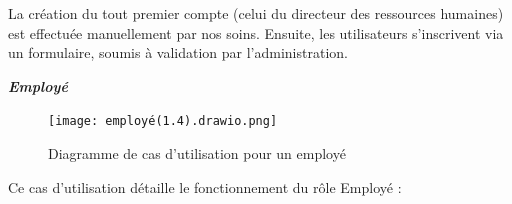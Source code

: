 \documentclass{article}
\begin{document}
\noindent La création du tout premier compte (celui du directeur des ressources humaines) est effectuée manuellement par nos soins. Ensuite, les utilisateurs s’inscrivent via un formulaire, soumis à validation par l’administration.
\newpage
\begin{center}
     \textbf{\textit{Employé}}
\end{center}
\begin{figure}[H]
  \centering
  \texttt{[image: employé(1.4).drawio.png]}
  \caption{Diagramme de cas d'utilisation pour un employé}
  \label{fig:employéusecase}
\end{figure}









Ce cas d’utilisation détaille le fonctionnement du rôle Employé :
\end{document}
